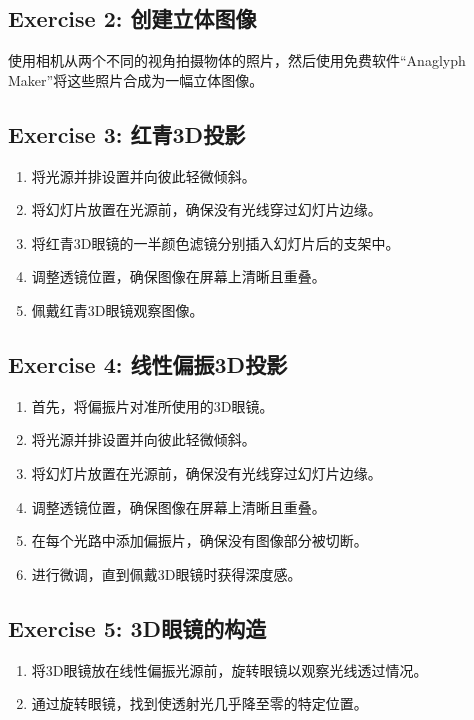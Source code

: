 \documentclass{ctexart}
\begin{document}
\subsection{Exercise 2: 创建立体图像}
使用相机从两个不同的视角拍摄物体的照片，然后使用免费软件“Anaglyph Maker”将这些照片合成为一幅立体图像。

\subsection{Exercise 3: 红青3D投影}
\begin{enumerate}
    \item 将光源并排设置并向彼此轻微倾斜。
    \item 将幻灯片放置在光源前，确保没有光线穿过幻灯片边缘。
    \item 将红青3D眼镜的一半颜色滤镜分别插入幻灯片后的支架中。
    \item 调整透镜位置，确保图像在屏幕上清晰且重叠。
    \item 佩戴红青3D眼镜观察图像。
\end{enumerate}

\subsection{Exercise 4: 线性偏振3D投影}
\begin{enumerate}
    \item 首先，将偏振片对准所使用的3D眼镜。
    \item 将光源并排设置并向彼此轻微倾斜。
    \item 将幻灯片放置在光源前，确保没有光线穿过幻灯片边缘。
    \item 调整透镜位置，确保图像在屏幕上清晰且重叠。
    \item 在每个光路中添加偏振片，确保没有图像部分被切断。
    \item 进行微调，直到佩戴3D眼镜时获得深度感。
\end{enumerate}

\subsection{Exercise 5: 3D眼镜的构造}
\begin{enumerate}
    \item 将3D眼镜放在线性偏振光源前，旋转眼镜以观察光线透过情况。
    \item 通过旋转眼镜，找到使透射光几乎降至零的特定位置。
\end{enumerate}
\end{document}
